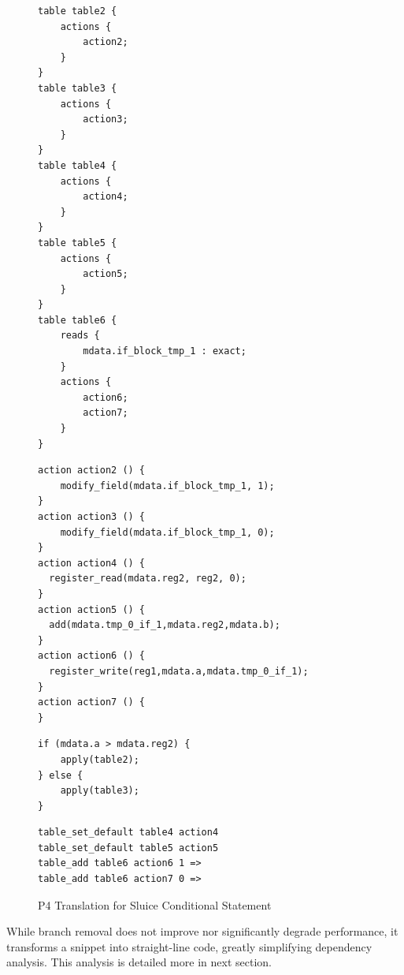 \documentclass[12pt, oneside]{article}
\begin{document}
\begin{figure}
\caption{P4 Translation for Sluice Conditional Statement}\label{condP4}
\captionsetup{justification=centering, font=footnotesize,labelfont=footnotesize}
\begin{minipage}{.46\textwidth} 
\begin{lstlisting}[title=P4 Match Action Tables, frame=tlrb, basicstyle=\linespread{1.3}\scriptsize]
table table2 {
    actions {
        action2;
    }
}
table table3 {
    actions {
        action3;
    }
}
table table4 {
    actions {
        action4;
    }
}
table table5 {
    actions {
        action5;
    }
}
table table6 {
    reads {
        mdata.if_block_tmp_1 : exact;
    }
    actions {
        action6;
        action7;
    }
}
\end{lstlisting}
\end{minipage}
\qquad
\begin{minipage}{0.515\textwidth} 
\begin{lstlisting}[title=P4 Actions, frame=tlrb, basicstyle=\linespread{1.3}\scriptsize]
action action2 () {
    modify_field(mdata.if_block_tmp_1, 1); 
}
action action3 () {
    modify_field(mdata.if_block_tmp_1, 0); 
}
action action4 () {
  register_read(mdata.reg2, reg2, 0);
}
action action5 () {
  add(mdata.tmp_0_if_1,mdata.reg2,mdata.b);
}
action action6 () {
  register_write(reg1,mdata.a,mdata.tmp_0_if_1);
}
action action7 () {
}
\end{lstlisting}
\begin{lstlisting}[title=P4 Ingress Control, frame=tlrb, basicstyle=\linespread{1.3}\scriptsize]
if (mdata.a > mdata.reg2) {
    apply(table2);
} else {
    apply(table3);
}
\end{lstlisting}
\begin{lstlisting}[title=Control Plane Entries, frame=tlrb, basicstyle=\linespread{1.3}\scriptsize]
table_set_default table4 action4
table_set_default table5 action5
table_add table6 action6 1 => 
table_add table6 action7 0 => 
\end{lstlisting}
\end{minipage}
\end{figure}

While branch removal does not improve nor significantly degrade performance, it transforms a snippet into straight-line code, greatly simplifying dependency analysis. This analysis is detailed more in next section. 

\newpage
\end{document}
